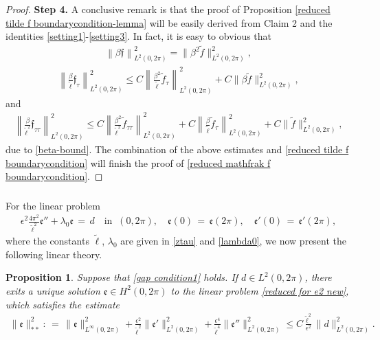 \documentclass[10pt, reqno]{amsart}
\numberwithin{equation}{section}
\newtheorem{proposition}[theorem]{Proposition}
\theoremstyle{definition}
\begin{document}
{\begin{proof}
\medskip
{\bf{Step 4.}}
A conclusive remark is that the proof of Proposition \ref{reduced tilde f boundarycondition-lemma} will be easily derived from Claim 2
and the identities \eqref{setting1}-\eqref{setting3}.
In fact, it is easy to obvious that
\begin{align*}
\left\| \beta{\mathfrak f} \right\|_{L^2(0, 2\pi)}^2
= \big\| \beta^2{\tilde f} \big\|_{L^2(0, 2\pi)}^2,
\end{align*}
\begin{align*}
\left\| \frac{\beta}{\tilde\ell} {\mathfrak f}_\tau \right\|_{L^2(0, 2\pi)}^2
\leq
C\left\| \frac{\beta^2}{\tilde\ell}{\tilde f}_\tau \right\|_{L^2(0, 2\pi)}^2
+
C\big\| \beta{\tilde f} \big\|_{L^2(0, 2\pi)}^2,
\end{align*}
and
\begin{align*}
\left\| \frac{\beta}{{\tilde\ell}^2} {\mathfrak f}_{\tau\tau} \right\|_{L^2(0, 2\pi)}^2
\leq
C\left\| \frac{\beta^2}{{\tilde\ell}^2}{\tilde f}_{\tau\tau} \right\|_{L^2(0, 2\pi)}^2
+
C\left\| \frac{\beta}{{\tilde\ell}}{\tilde f}_\tau \right\|_{L^2(0, 2\pi)}^2
+
C\big\| {\tilde f} \big\|_{L^2(0, 2\pi)}^2,
\end{align*}
due to \eqref{beta-bound}.
The combination of the above estimates and \eqref{reduced tilde f boundarycondition}
will finish the proof of \eqref{reduced mathfrak f boundarycondition}.
\end{proof}






\medskip
\subsubsection{}
For the linear problem
\begin{align} \label{reduced for e2 new}
\epsilon^2\frac{4\pi^2}{{\tilde\ell}^2} {\mathfrak e}'' + \lambda_0 {\mathfrak e} \,=\, d\quad\mbox{in }\ (0,2\pi),
\quad {\mathfrak e}(0) \,=\, {\mathfrak e}(2\pi),
\quad {\mathfrak e}'(0) \,=\, {\mathfrak e}' (2\pi),
\end{align}
where the constants ${\tilde\ell}$, $\lambda_0$ are given in \eqref{ztau} and \eqref{lambda0}, we now present the following linear theory.

\begin{proposition} \label{linear theory for e}
Suppose that \eqref{gap condition1} holds.
If $d\in L^2(0, 2\pi)$, there exits a unique solution ${\mathfrak e}\in H^2 (0,2\pi)$ to the linear problem \eqref{reduced for e2 new}, which satisfies the estimate
\begin{align} \label{estimate norm of e1}
\|{\mathfrak e}\|^2_{**}
:\,=\,
\|{\mathfrak e}\|^2_{L^\infty(0, 2\pi)}
+ \frac{\epsilon^2}{{\tilde\ell}^2} \|{\mathfrak e}'\|^2_{L^2 (0, 2\pi)}
+ \frac{\epsilon^4} {{\tilde\ell}^4}\|{\mathfrak e}''\|^2_{L^2(0, 2\pi)}
\leq C \frac{{\tilde\ell}^2} {\epsilon^2} \| d\|^2_{L^2(0, 2\pi)}.
\end{align}




\end{proposition}}
\end{document}
